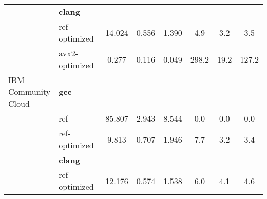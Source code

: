 \begin{table}[H]
\begin{tabularx}{\linewidth}{l l c c c c c c}
          & \textbf{clang} & & & & & \\
          & ref-optimized & 14.024 & 0.556 & 1.390 & 4.9 & 3.2 & 3.5\\
          & avx2-optimized & 0.277 & 0.116 & 0.049 & 298.2 & 19.2 & 127.2\\
          \midrule
          \multirowcell{5}{IBM\\ Community\\ Cloud}
          & \textbf{gcc} & & & & & \\
          & ref & 85.807 & 2.943 & 8.544 & 0.0 & 0.0 & 0.0\\
          & ref-optimized & 9.813 & 0.707 & 1.946 & 7.7 & 3.2 & 3.4\\
          & \textbf{clang} & & & & & \\
          & ref-optimized & 12.176 & 0.574 & 1.538 & 6.0 & 4.1 & 4.6\\
        \bottomrule
    \end{tabularx}
\end{table}